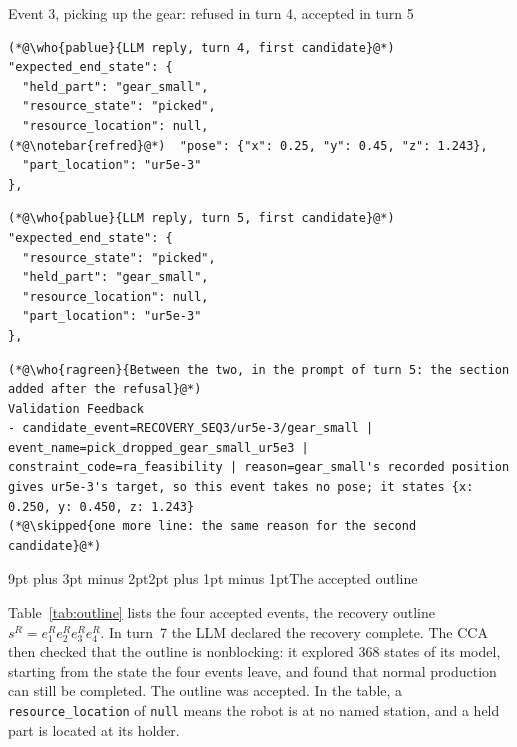 \documentclass[preprint,12pt,authoryear]{elsarticle}
\makeatletter
\renewcommand\subsection{\@startsection{subsection}{2}{\z@}%
  {9pt plus 3pt minus 2pt}{2pt plus 1pt minus 1pt}{\normalsize\bfseries}}
\newcommand{\vd}{\raisebox{-0.1ex}{\vbox{\baselineskip 3pt\lineskip 0pt\lineskiplimit 0pt\hbox{.}\hbox{.}\hbox{.}}}}
\newcommand{\skipped}[1]{{\normalfont\color{cutgray}\vd\enspace{\itshape\footnotesize #1}}}
\newcommand{\who}[2]{{\normalfont\sffamily\bfseries\footnotesize\color{#1}#2}}
\newcommand{\notebar}[1]{\rlap{\hspace{-5pt}\textcolor{#1}{\rule[-0.35ex]{2pt}{1.9ex}}}}
\let\code\nolinkurl
\makeatother
\begin{document}
\begin{table}[H]
\begin{recbox}{Event 3, picking up the gear: refused in turn 4, accepted in turn 5}
\begin{minipage}[t]{0.485\linewidth}
\begin{lstlisting}
(*@\who{pablue}{LLM reply, turn 4, first candidate}@*)
"expected_end_state": {
  "held_part": "gear_small",
  "resource_state": "picked",
  "resource_location": null,
(*@\notebar{refred}@*)  "pose": {"x": 0.25, "y": 0.45, "z": 1.243},
  "part_location": "ur5e-3"
},
\end{lstlisting}
\end{minipage}\hfill
\begin{minipage}[t]{0.485\linewidth}
\begin{lstlisting}
(*@\who{pablue}{LLM reply, turn 5, first candidate}@*)
"expected_end_state": {
  "resource_state": "picked",
  "held_part": "gear_small",
  "resource_location": null,
  "part_location": "ur5e-3"
},
\end{lstlisting}
\end{minipage}

\vspace{3pt}
\begin{lstlisting}
(*@\who{ragreen}{Between the two, in the prompt of turn 5: the section added after the refusal}@*)
Validation Feedback
- candidate_event=RECOVERY_SEQ3/ur5e-3/gear_small | event_name=pick_dropped_gear_small_ur5e3 | constraint_code=ra_feasibility | reason=gear_small's recorded position gives ur5e-3's target, so this event takes no pose; it states {x: 0.250, y: 0.450, z: 1.243}
(*@\skipped{one more line: the same reason for the second candidate}@*)
\end{lstlisting}
\end{recbox}
\caption{A feasibility refusal: the end state before and after, and the feedback between them.}\label{tab:ra}
\end{table}

\subsection{The accepted outline}

Table~\ref{tab:outline} lists the four accepted events, the recovery outline
$s^R = e^R_1 e^R_2 e^R_3 e^R_4$. In turn~7 the LLM declared the recovery complete. The CCA then
checked that the outline is nonblocking: it explored 368 states of its model, starting from the
state the four events leave, and found that normal production can still be completed. The
outline was accepted. In the table, a \code{resource_location} of \code{null} means the robot
is at no named station, and a held part is located at its holder.
\end{document}
